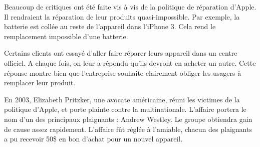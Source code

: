 \smallskip
Beaucoup de critiques ont été faite vis à vis de la politique de réparation d'Apple. Il rendraient la réparation de leur produits quasi-impossible. Par exemple, la batterie est collée au reste de l'appareil dans l'iPhone 3. Cela rend le remplacement impossible d'une batterie. 

Certains clients ont essayé d'aller faire réparer leurs appareil dans un centre officiel. A chaque fois, on leur a répondu qu'ils devront en acheter un autre. Cette réponse montre bien que l'entreprise souhaite clairement obliger les usagers à remplacer leur produit. 
\smallskip


En 2003, Elizabeth Pritzker, une avocate américaine, réuni les victimes de la politique d'Apple, et porte plainte contre la multinationale. L'affaire portera le nom d'un des principaux plaignants : Andrew Westley. Le groupe obtiendra gain de cause assez rapidement. L'affaire fût réglée à l'amiable, chacun des plaignants a pu recevoir 50\$ en bon d'achat pour un nouvel appareil. 

